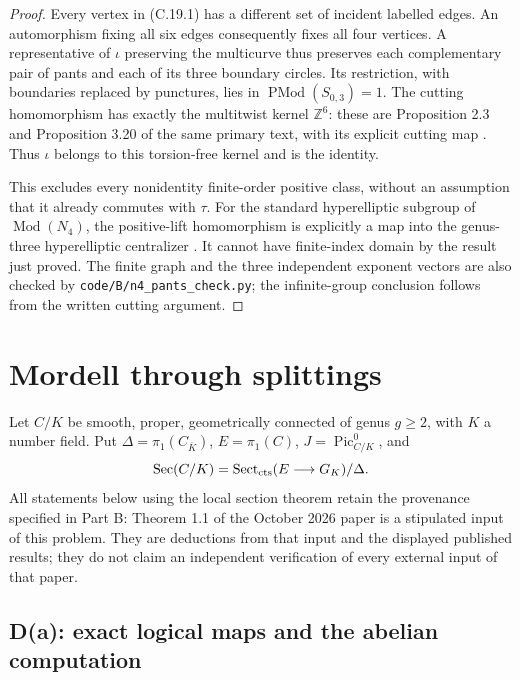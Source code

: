 \documentclass[11pt,oneside]{article}
\begin{document}
\begin{proof}
Every vertex in (C.19.1) has a different set of incident labelled
edges. An automorphism fixing all six edges consequently fixes
all four vertices. A representative of $\iota$ preserving the
multicurve thus preserves each complementary pair of pants
and each of its three boundary circles. Its restriction, with
boundaries replaced by punctures, lies in
$\operatorname{PMod}(S_{0,3})=1$.
The cutting homomorphism has exactly the multitwist kernel
$\mathbb Z^6$: these are Proposition 2.3 and Proposition 3.20
of the same primary text, with its explicit cutting map
\cite{CextraFarbMargalit}. Thus $\iota$ belongs to this
torsion-free kernel and is the identity.

This excludes every nonidentity finite-order positive class,
without an assumption that it already commutes with $\tau$.
For the standard hyperelliptic subgroup of $\operatorname{Mod}(N_4)$,
the positive-lift homomorphism is explicitly a map into the
genus-three hyperelliptic centralizer
\cite[p.~1030]{CextraStukow2016}. It cannot have finite-index
domain by the result just proved. The finite graph and the
three independent exponent vectors are also checked by
\texttt{code/B/n4\_pants\_check.py}; the infinite-group
conclusion follows from the written cutting argument.
\end{proof}

\section{Mordell through splittings}
\label{sec:D}
Let $C/K$ be smooth, proper, geometrically connected of
genus $g\geq2$, with $K$ a number field. Put
$\Delta=\pi_1(C_{\overline K})$, $E=\pi_1(C)$,
$J=\operatorname{Pic}^0_{C/K}$, and
\[
 \operatorname{Sec}(C/K)=
 \operatorname{Sect}_{\rm cts}(E\longrightarrow G_K)/\Delta .
\]
All statements below using the local section theorem retain
the provenance specified in Part B: Theorem 1.1 of the
October 2026 paper is a stipulated input of this problem.
They are deductions from that input and the displayed
published results; they do not claim an independent
verification of every external input of that paper.

\subsection{D(a): exact logical maps and the abelian computation}
\end{document}
